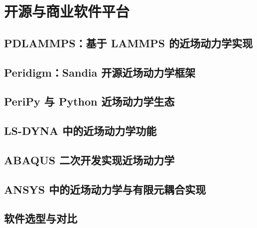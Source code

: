 \chapter{开源与商业软件平台}

\section{PDLAMMPS：基于 LAMMPS 的近场动力学实现}

\section{Peridigm：Sandia 开源近场动力学框架}

\section{PeriPy 与 Python 近场动力学生态}

\section{LS-DYNA 中的近场动力学功能}

\section{ABAQUS 二次开发实现近场动力学}

\section{ANSYS 中的近场动力学与有限元耦合实现}

\section{软件选型与对比}
